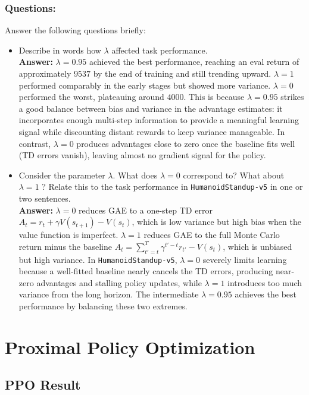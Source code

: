 \documentclass{article}
\begin{document}
\subsubsection{Questions:}

Answer the following questions briefly:
\begin{itemize}
    \item Describe in words how $\lambda$ affected task performance. \\
    \textbf{Answer:} $\lambda=0.95$ achieved the best performance, reaching an eval return of approximately $9537$ by the end of training and still trending upward. $\lambda=1$ performed comparably in the early stages but showed more variance. $\lambda=0$ performed the worst, plateauing around $4000$. This is because $\lambda=0.95$ strikes a good balance between bias and variance in the advantage estimates: it incorporates enough multi-step information to provide a meaningful learning signal while discounting distant rewards to keep variance manageable. In contrast, $\lambda=0$ produces advantages close to zero once the baseline fits well (TD errors vanish), leaving almost no gradient signal for the policy.

    \item Consider the parameter $\lambda$. What does $\lambda=0$ correspond to? What about $\lambda=1$ ? Relate this to the task performance in \texttt{HumanoidStandup-v5} in one or two sentences. \\
    \textbf{Answer:} $\lambda=0$ reduces GAE to a one-step TD error $A_t = r_t + \gamma V(s_{t+1}) - V(s_t)$, which is low variance but high bias when the value function is imperfect. $\lambda=1$ reduces GAE to the full Monte Carlo return minus the baseline $A_t = \sum_{t'=t}^{T} \gamma^{t'-t} r_{t'} - V(s_t)$, which is unbiased but high variance. In \texttt{HumanoidStandup-v5}, $\lambda=0$ severely limits learning because a well-fitted baseline nearly cancels the TD errors, producing near-zero advantages and stalling policy updates, while $\lambda=1$ introduces too much variance from the long horizon. The intermediate $\lambda=0.95$ achieves the best performance by balancing these two extremes.
\end{itemize}


\section{Proximal Policy Optimization}
\label{sec:ppo}

\subsection{PPO Result}
\end{document}
